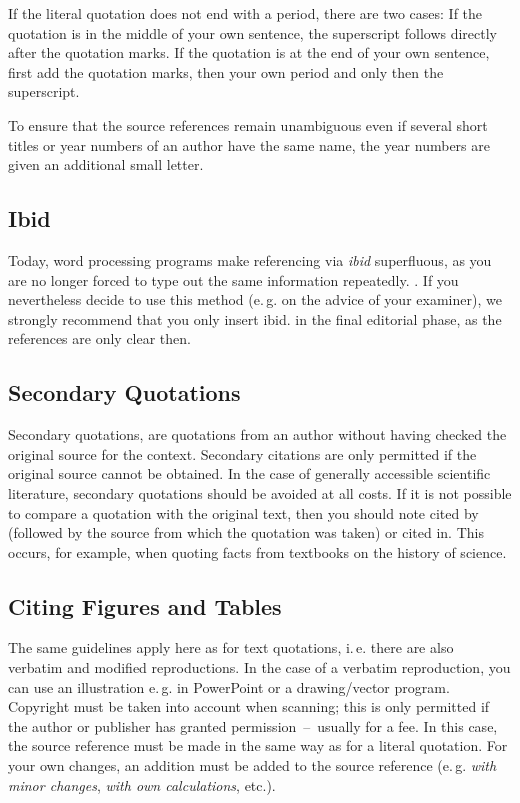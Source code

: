 If the literal quotation does not end with a period, there are two cases: If the 
quotation is in the middle of your own sentence, the superscript follows 
directly after the quotation marks. If the quotation is at the end of your own 
sentence, first add the quotation marks, then your own period and only then the 
superscript.

To ensure that the source references remain unambiguous even if several short 
titles or year numbers of an author have the same name, the year numbers are 
given an additional small letter.

\subsection{Ibid}
Today, word processing programs make referencing via \emph{ibid} superfluous, as 
you are no longer forced to type out the same information repeatedly. . If you 
nevertheless decide to use this method (e.\,g. on the advice of your examiner), 
we strongly recommend that you only insert ibid. in the final editorial phase, 
as the references are only clear then.

\subsection{Secondary Quotations}
Secondary quotations, are quotations from an author without having checked the 
original source for the context. Secondary citations are only permitted if the 
original source cannot be obtained. In the case of generally accessible 
scientific literature, secondary quotations should be avoided at all costs. If 
it is not possible to compare a quotation with the original text, then you 
should note cited by (followed by the source from which the quotation was 
taken) or cited in. This occurs, for example, when quoting facts from textbooks on the history of science.

\subsection{Citing Figures and Tables}
\label{sec:refFigures}
The same guidelines apply here as for text quotations, i.\,e. there are also 
verbatim and modified reproductions. In the case of a verbatim reproduction, you 
can use an illustration e.\,g. in PowerPoint or a drawing\slash vector program. 
Copyright must be taken into account when scanning; this is only permitted if 
the author or publisher has granted permission~--~usually for a fee. In this 
case, the source reference must be made in the same way as for a literal 
quotation. For your own changes, an addition must be added to the source 
reference (e.\,g. \emph{with minor changes}, \emph{with own calculations}, etc.).

